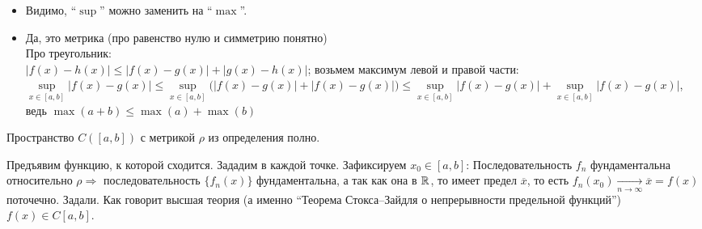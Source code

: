 \begin{NB*}\leavevmode
    \begin{itemize}
        \item Видимо, ``$\sup$'' можно заменить на ``$\max$''.
        \item Да, это метрика (про равенство нулю и симметрию понятно)\\
        Про треугольник:\\$|f(x)-h(x)|\leqslant|f(x)-g(x)|+|g(x)-h(x)|$; возьмем максимум левой и правой части:\\
        $\sup\limits_{x\in[a,b]}|f(x)-g(x)|\leqslant\sup\limits_{x\in[a,b]}\bigl(|f(x)-g(x)|+|f(x)-g(x)|\bigr)\leqslant\sup\limits_{x\in[a,b]}|f(x)-g(x)|+\sup\limits_{x\in[a,b]}|f(x)-g(x)|$, ведь $\max(a+b)\leqslant\max(a)+\max(b)$
    \end{itemize}
    
\end{NB*}

\begin{Theorem*}
    Пространство $C([a,b])$ с метрикой $\rho$ из определения полно.
\end{Theorem*}

\begin{Proof}
    Предъявим функцию, к которой сходится. Зададим в каждой точке. Зафиксируем $x_0\in[a,b]$:
    Последовательность $f_n$ фундаментальна относительно $\rho\Rightarrow$ последовательность $\{f_n(x)\}$ фундаментальна, а так как она в $\rmy[]$, то имеет предел $\overline{x}$, то есть $f_n(x_0)\xrightarrow[n\to\infty]{}\overline{x}=f(x)$ поточечно. Задали. Как говорит высшая теория (а именно ``Теорема Стокса--Зайдля о непрерывности предельной функций'') $f(x)\in C[a,b]$.
\end{Proof}

\newpage
